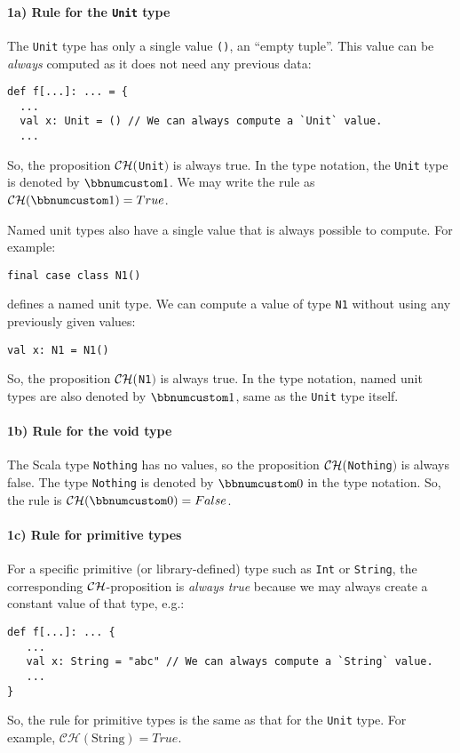 \paragraph{1a) Rule for the \texttt{Unit} type}

The \lstinline!Unit! type has only a single value \lstinline!()!,
an \textsf{``}empty tuple\textsf{''}. This value can be \emph{always} computed as
it does not need any previous data:
\begin{lstlisting}
def f[...]: ... = {
  ...
  val x: Unit = () // We can always compute a `Unit` value.
  ...
\end{lstlisting}
So, the proposition ${\cal CH}($\lstinline!Unit!$)$ is always true.
In the type notation, the \lstinline!Unit! type is denoted by $\bbnum 1$.
We may write the rule as $\mathcal{CH}(\bbnum 1)=True$. 

Named unit types also have a single value
that is always possible to compute. For example:
\begin{lstlisting}
final case class N1()
\end{lstlisting}
defines a named unit type. We can compute a value of type \lstinline!N1!
without using any previously given values:
\begin{lstlisting}
val x: N1 = N1()
\end{lstlisting}
So, the proposition ${\cal CH}($\lstinline!N1!$)$ is always true.
In the type notation, named unit types are also denoted by $\bbnum 1$,
same as the \lstinline!Unit! type itself.

\paragraph{1b) Rule for the void type}

The Scala type \lstinline!Nothing! has no values, so the proposition
${\cal CH}($\lstinline!Nothing!$)$ is always false. The type \lstinline!Nothing!
is denoted by $\bbnum 0$ in the type notation. So, the rule is $\mathcal{CH}(\bbnum 0)=False$.

\paragraph{1c) Rule for primitive types}

For a specific primitive (or library-defined) type such as \lstinline!Int!
or \lstinline!String!, the corresponding ${\cal CH}$-proposition
is \emph{always true} because we may always create a constant value
of that type, e.g.:
\begin{lstlisting}
def f[...]: ... {
   ...
   val x: String = "abc" // We can always compute a `String` value.
   ...
}
\end{lstlisting}
So, the rule for primitive types is the same as that for the \lstinline!Unit!
type. For example, $\mathcal{CH}(\text{String})=True$.

